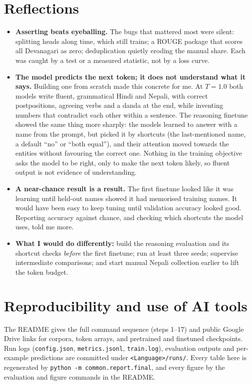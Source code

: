 \documentclass[10pt,a4paper]{article}
\newif\ifdraft
\newcommand{\todo}[1]{\ifdraft{\color{red}\textbf{[TODO: #1]}}\fi}
\newcommand{\code}[1]{\texttt{#1}}
\begin{document}
\section{Reflections}
\todo{This section must be in your own words: the brief grades your reflections. The points below are draft prompts drawn from the project history. Rewrite, cut or replace them.}
\begin{itemize}
\item \textbf{Asserting beats eyeballing.} The bugs that mattered most were silent: splitting heads along time, which still trains; a ROUGE package that scores all Devanagari as zero; deduplication quietly eroding the manual share. Each was caught by a test or a measured statistic, not by a loss curve.
\item \textbf{The model predicts the next token; it does not understand what it says.} Building one from scratch made this concrete for me. At $T{=}1.0$ both models write fluent, grammatical Hindi and Nepali, with correct postpositions, agreeing verbs and a danda at the end, while inventing numbers that contradict each other within a sentence. The reasoning finetune showed the same thing more sharply: the models learned to answer with a name from the prompt, but picked it by shortcuts (the last-mentioned name, a default ``no'' or ``both equal''), and their attention moved towards the entities without favouring the correct one. Nothing in the training objective asks the model to be right, only to make the next token likely, so fluent output is not evidence of understanding.
\item \textbf{A near-chance result is a result.} The first finetune looked like it was learning until held-out names showed it had memorised training names. It would have been easy to keep tuning until validation accuracy looked good. Reporting accuracy against chance, and checking which shortcuts the model uses, told me more.
\item \textbf{What I would do differently:} build the reasoning evaluation and its shortcut checks \emph{before} the first finetune; run at least three seeds; supervise intermediate comparisons; and start manual Nepali collection earlier to lift the token budget.
\end{itemize}

\section{Reproducibility and use of AI tools}
The README gives the full command sequence (steps 1--17) and public Google Drive links for corpora, token arrays, and pretrained and finetuned checkpoints. Run logs (\code{config.json}, \code{metrics.jsonl}, \code{train.log}), evaluation outputs and per-example predictions are committed under \code{<Language>/runs/}.
Every table here is regenerated by \code{python -m common.report.final}, and every figure by the evaluation and figure commands in the README.
\end{document}
